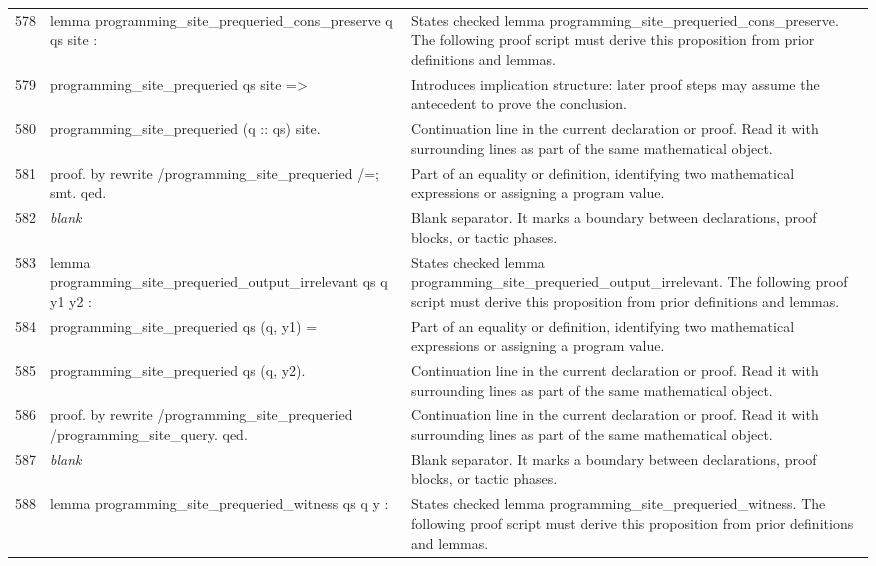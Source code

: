 \documentclass[10pt]{article}
\begin{document}
\begin{longtable}{r L{0.53\textwidth} L{0.37\textwidth}}
578 & {\ttfamily\scriptsize lemma programming\_site\_prequeried\_cons\_preserve q qs site :} & States checked lemma programming\_site\_prequeried\_cons\_preserve.  The following proof script must derive this proposition from prior definitions and lemmas. \\
579 & {\ttfamily\scriptsize   programming\_site\_prequeried qs site =>} & Introduces implication structure: later proof steps may assume the antecedent to prove the conclusion. \\
580 & {\ttfamily\scriptsize   programming\_site\_prequeried (q :: qs) site.} & Continuation line in the current declaration or proof.  Read it with surrounding lines as part of the same mathematical object. \\
581 & {\ttfamily\scriptsize proof. by rewrite /programming\_site\_prequeried /=; smt. qed.} & Part of an equality or definition, identifying two mathematical expressions or assigning a program value. \\
582 & {\ttfamily\scriptsize \emph{blank}} & Blank separator.  It marks a boundary between declarations, proof blocks, or tactic phases. \\
583 & {\ttfamily\scriptsize lemma programming\_site\_prequeried\_output\_irrelevant qs q y1 y2 :} & States checked lemma programming\_site\_prequeried\_output\_irrelevant.  The following proof script must derive this proposition from prior definitions and lemmas. \\
584 & {\ttfamily\scriptsize   programming\_site\_prequeried qs (q, y1) =} & Part of an equality or definition, identifying two mathematical expressions or assigning a program value. \\
585 & {\ttfamily\scriptsize   programming\_site\_prequeried qs (q, y2).} & Continuation line in the current declaration or proof.  Read it with surrounding lines as part of the same mathematical object. \\
586 & {\ttfamily\scriptsize proof. by rewrite /programming\_site\_prequeried /programming\_site\_query. qed.} & Continuation line in the current declaration or proof.  Read it with surrounding lines as part of the same mathematical object. \\
587 & {\ttfamily\scriptsize \emph{blank}} & Blank separator.  It marks a boundary between declarations, proof blocks, or tactic phases. \\
588 & {\ttfamily\scriptsize lemma programming\_site\_prequeried\_witness qs q y :} & States checked lemma programming\_site\_prequeried\_witness.  The following proof script must derive this proposition from prior definitions and lemmas. \\

\end{longtable}
\end{document}
